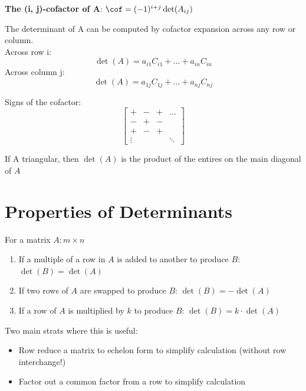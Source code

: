 \documentclass{report}
\begin{document}
\textbf{The (i, j)-cofactor of A}: $\cof = (-1)^{i+j}\det(A_{ij})$

\begin{theorem}
    The determinant of A can be computed by cofactor expansion across any row or column.\\
    Across row i:
    \[
    \det(A) = a_{i1}C_{i1} + \ldots + a_{in}C_{in}
    \]
    Across column j:
    \[
    \det(A) = a_{1j}C_{1j} + \ldots + a_{nj}C_{nj}
    \]
\end{theorem}

Signs of the cofactor:
\[
\begin{bmatrix}
    + & - & + & \ldots \\
    - & + & - & \\
    + & - & + & \\
    \vdots & & & \ddots
\end{bmatrix}
\]

\begin{theorem}
    If A triangular, then $\det(A)$ is the product of the entires on the main diagonal of $A$
\end{theorem}

\section{Properties of Determinants}

\begin{theorem}\end{theorem}
\begin{tcolorbox}[colback=blue!5!white, colframe=blue!75!black, title=Row Operations]
For a matrix $A: m \times n$
\begin{enumerate}[label=\alph*.]
    \item If a multiple of a row in $A$ is added to another to produce $B$: $\det(B) = \det(A)$
    \item If two rows of $A$ are swapped to produce $B$: $\det(B) = -\det(A)$
    \item If a row of $A$ is multiplied by $k$ to produce $B$: $\det(B) = k \cdot \det(A)$
\end{enumerate}
\end{tcolorbox}
Two main strats where this is useful:
\begin{itemize}
    \item Row reduce a matrix to echelon form to simplify calculation (without row interchange!)
    \item Factor out a common factor from a row to simplify calculation
\end{itemize}
\end{document}
